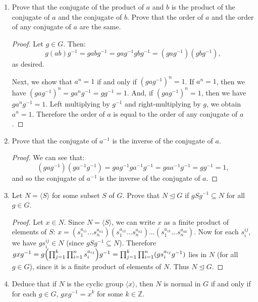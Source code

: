 \documentclass{article}
\begin{document}
\begin{enumerate}[label=(\alph*), itemsep=0em]
    \item Prove that the conjugate of the product of $a$ and $b$ is the product of the conjugate of $a$ and the conjugate of $b$. Prove that the order of $a$ and the order of any conjugate of $a$ are the same.
          \begin{proof}
            Let $g \in G$. Then:
            \begin{equation*}g(ab)g^{-1} = gabg^{-1} = gag^{-1}gbg^{-1} = (gag^{-1})(gbg^{-1}),\end{equation*}
            as desired.

            Next, we show that $a^n = 1$ if and only if $(gag^{-1})^n = 1$. If $a^n = 1$, then we have $(gag^{-1})^n = ga^ng^{-1} = gg^{-1} = 1$. And, if $(gag^{-1})^n = 1$, then we have $ga^ng^{-1} = 1$. Left multiplying by $g^{-1}$ and right-multiplying by $g$, we obtain $a^n = 1$. Therefore the order of $a$ is equal to the order of any conjugate of $a$.
          \end{proof}
    \item Prove that the conjugate of $a^{-1}$ is the inverse of the conjugate of $a$.
          \begin{proof}
            We can see that:
            \begin{equation*}(gag^{-1})(ga^{-1}g^{-1}) = gag^{-1}ga^{-1}g^{-1} = gaa^{-1}g^{-1} = gg^{-1} = 1,\end{equation*}
            and so the conjugate of $a^{-1}$ is the inverse of the conjugate of $a$.
          \end{proof}
    \item Let $N = \langle S \rangle$ for some subset $S$ of $G$. Prove that $N \unlhd G$ if $gSg^{-1} \subseteq N$ for all $g \in G$.
          \begin{proof}
            Let $x \in N$. Since $N = \langle S \rangle$, we can write $x$ as a finite product of elements of $S$: $x = (s_1^{a_{11}}...s_n^{a_{n1}})(s_1^{a_{12}}...s_n^{a_{n2}})...(s_1^{a_{1k}}...s_n^{a_{nk}})$. Now for each $s_i^{ij}$, we have $gs_i^{ij} \in N$ (since $gSg^{-1} \subseteq N$). Therefore $gxg^{-1} = g \Bigl( \prod_{j = 1}^{k} \prod_{i = 1}^{n} s_i^{a_{ij}} \Bigr) g^{-1} = \prod_{j = 1}^{k} \prod_{i = 1}^{n} (g s_i^{a_{ij}} g^{-1})$ lies in $N$ (for all $g \in G$), since it is a finite product of elements of $N$. Thus $N \unlhd G$.
          \end{proof}
    \item Deduce that if $N$ is the cyclic group $\langle x \rangle$, then $N$ is normal in $G$ if and only if for each $g \in G$, $gxg^{-1} = x^k$ for some $k \in \mathbb{Z}$.


\end{enumerate}
\end{document}
